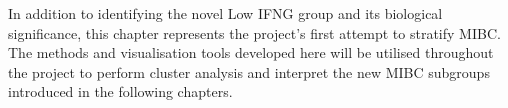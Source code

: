 In addition to identifying the novel Low IFNG group and its biological significance, this chapter represents the project's first attempt to stratify MIBC. The methods and visualisation tools developed here will be utilised throughout the project to perform cluster analysis and interpret the new MIBC subgroups introduced in the following chapters.
